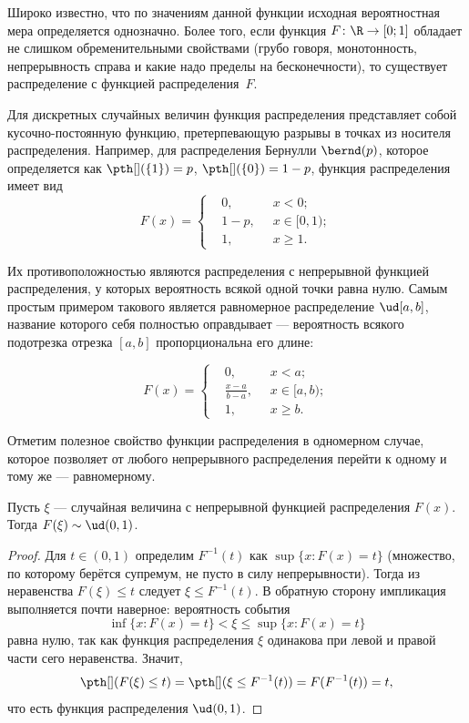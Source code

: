 Широко известно, что по значениям данной функции исходная вероятностная мера определяется однозначно. Более того, если функция $F\colon \R \to  [0; 1]$ обладает не слишком обременительными свойствами (грубо говоря, монотонность, непрерывность справа и какие надо пределы на бесконечности), то существует распределение с функцией распределения~$F$.

\begin{example}
	Для дискретных случайных величин функция распределения представляет собой кусочно-постоянную функцию, претерпевающую разрывы в точках из носителя распределения. Например, для распределения Бернулли $\bernd(p)$, которое определяется как $\pth[](\{1\}) = p$, $\pth[](\{0\}) = 1 - p$, функция распределения имеет вид
	\[
	F(x) = \left\{\begin{aligned}
		&0, \;\; &x < 0;\\
		&1-p,\;\; &x \in [0, 1);\\
		&1, \;\; &x \ge 1.
	\end{aligned}\right.
	\]
	
	Их противоположностью являются распределения с непрерывной функцией распределения, у которых вероятность всякой одной точки равна нулю. Самым простым примером такового является равномерное распределение $\ud[a, b]$, название которого себя полностью оправдывает --- вероятность всякого подотрезка отрезка $[a, b]$ пропорциональна его длине:
	
	\[
	F(x) = \left\{\begin{aligned}
		&0, \;\; &x < a;\\
		&\frac{x-a}{b-a},\;\; &x \in [a, b);\\
		&1, \;\; &x \ge b.
	\end{aligned}\right.
	\]
\end{example}

Отметим полезное свойство функции распределения в одномерном случае, которое позволяет от любого непрерывного распределения перейти к одному и тому же --- равномерному.

\begin{proposition}\label{f_to_uniform}
    Пусть $\xi$ --- случайная величина с непрерывной функцией распределения $F(x)$. Тогда $F(\xi) \sim \ud(0, 1)$.
\end{proposition}

\begin{proof}
    Для $t \in (0, 1)$ определим $F^{-1}(t)$ как $\sup\{x\colon F(x) = t\}$ (множество, по которому берётся супремум, не пусто в силу непрерывности). Тогда из неравенства $F(\xi) \le t$ следует $\xi \le F^{-1}(t)$. В обратную сторону импликация выполняется почти наверное: вероятность события
    \[
    \inf\{x\colon F(x) = t\} < \xi \le \sup\{x\colon F(x) = t\}
    \]
    равна нулю, так как функция распределения $\xi$ одинакова при левой и правой части сего неравенства. Значит,
    \[
    \pth[](F(\xi) \le t) = \pth[](\xi \le F^{-1}(t)) = F(F^{-1}(t)) = t,
    \]
    что есть функция распределения $\ud(0, 1)$. 
\end{proof}

